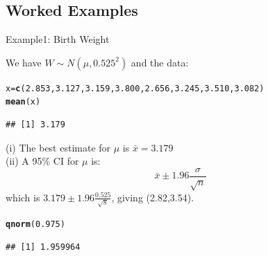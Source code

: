 \documentclass[t,xcolor=pdftex,dvipsnames,table]{beamer}\usepackage[]{graphicx}\usepackage[]{color}
\makeatletter
\newcommand{\hlnum}[1]{\textcolor[rgb]{0.686,0.059,0.569}{#1}}%
\newcommand{\hlstd}[1]{\textcolor[rgb]{0.345,0.345,0.345}{#1}}%
\newcommand{\hlkwb}[1]{\textcolor[rgb]{0.69,0.353,0.396}{#1}}%
\newcommand{\hlkwd}[1]{\textcolor[rgb]{0.737,0.353,0.396}{\textbf{#1}}}%
\newenvironment{kframe}{%
 \def\at@end@of@kframe{}%
 \ifinner\ifhmode%
  \def\at@end@of@kframe{\end{minipage}}%
  \begin{minipage}{\columnwidth}%
 \fi\fi%
 \def\FrameCommand##1{\hskip\@totalleftmargin \hskip-\fboxsep
 \colorbox{shadecolor}{##1}\hskip-\fboxsep
     \hskip-\linewidth \hskip-\@totalleftmargin \hskip\columnwidth}%
 \MakeFramed {\advance\hsize-\width
   \@totalleftmargin\z@ \linewidth\hsize
   \@setminipage}}%
 {\par\unskip\endMakeFramed%
 \at@end@of@kframe}
\newenvironment{knitrout}{}{} %
\makeatother
\begin{document}
\subsection[Worked Examples]{Worked Examples}
\begin{frame}[fragile]{Example1: Birth Weight}

We have $W \sim N(\mu,0.525^2)$ and the data:

\begin{knitrout}
\color{fgcolor}\begin{kframe}
\begin{alltt}
\hlstd{x}\hlkwb{=}\hlkwd{c}\hlstd{(}\hlnum{2.853}\hlstd{,}\hlnum{3.127}\hlstd{,}\hlnum{3.159}\hlstd{,}\hlnum{3.800}\hlstd{,}\hlnum{2.656}\hlstd{,}\hlnum{3.245}\hlstd{,}\hlnum{3.510}\hlstd{,}\hlnum{3.082}\hlstd{)}
\hlkwd{mean}\hlstd{(x)}
\end{alltt}
\begin{verbatim}
## [1] 3.179
\end{verbatim}
\end{kframe}
\end{knitrout}

(i) The best estimate for $\mu$ is $\bar{x} = 3.179$ \\

\vspace{.5cm}
(ii) A 95\% CI for $\mu$ is: 
\[ \bar{x}  \pm 1.96 \frac{\sigma}{\sqrt{n}} \] which is $3.179  \pm 1.96 \frac{0.525}{\sqrt{8}}$, giving (2.82,3.54).
\begin{knitrout}
\color{fgcolor}\begin{kframe}
\begin{alltt}
\hlkwd{qnorm}\hlstd{(}\hlnum{0.975}\hlstd{)}
\end{alltt}
\begin{verbatim}
## [1] 1.959964
\end{verbatim}
\end{kframe}
\end{knitrout}
\end{frame}
\end{document}
